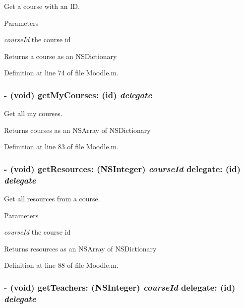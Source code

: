 Get a course with an ID. 
\begin{DoxyParams}{Parameters}
\item[{\em courseId}]the course id \end{DoxyParams}
\begin{DoxyReturn}{Returns}
a course as an NSDictionary 
\end{DoxyReturn}


Definition at line 74 of file Moodle.m.\hypertarget{interface_moodle_a381adeb477225e16f6bb35288c7d8a2a}{
\subsubsection[{getMyCourses:}]{\setlength{\rightskip}{0pt plus 5cm}-\/ (void) getMyCourses: (id) {\em delegate}}}
\label{interface_moodle_a381adeb477225e16f6bb35288c7d8a2a}


Get all my courses. \begin{DoxyReturn}{Returns}
courses as an NSArray of NSDictionary 
\end{DoxyReturn}


Definition at line 83 of file Moodle.m.\hypertarget{interface_moodle_a979d64f5269da915013a13ed7b7ccc08}{
\subsubsection[{getResources:delegate:}]{\setlength{\rightskip}{0pt plus 5cm}-\/ (void) getResources: (NSInteger) {\em courseId}\/ delegate: (id) {\em delegate}}}
\label{interface_moodle_a979d64f5269da915013a13ed7b7ccc08}


Get all resources from a course. 
\begin{DoxyParams}{Parameters}
\item[{\em courseId}]the course id \end{DoxyParams}
\begin{DoxyReturn}{Returns}
resources as an NSArray of NSDictionary 
\end{DoxyReturn}


Definition at line 88 of file Moodle.m.\hypertarget{interface_moodle_acfceceac0230b35cec8bf956529978f2}{
\subsubsection[{getTeachers:delegate:}]{\setlength{\rightskip}{0pt plus 5cm}-\/ (void) getTeachers: (NSInteger) {\em courseId}\/ delegate: (id) {\em delegate}}}
\label{interface_moodle_acfceceac0230b35cec8bf956529978f2}


